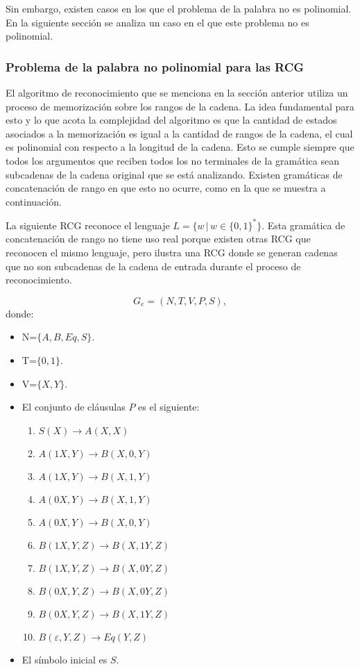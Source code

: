 \documentclass{article}
\begin{document}
Sin embargo, existen casos en los que el problema de la palabra no es polinomial. En la siguiente sección se analiza un caso en el que este problema no es polinomial.

\subsubsection{Problema de la palabra no polinomial para las RCG}

El algoritmo de reconocimiento que se menciona en la sección anterior utiliza un proceso de memorización sobre los rangos de la cadena.  La idea fundamental para esto y lo que acota la complejidad del algoritmo es que la cantidad de estados asociados a la memorización es igual a la cantidad de rangos de la cadena, el cual es polinomial con respecto a la longitud de la cadena. Esto se cumple siempre que todos los argumentos que reciben todos los no terminales de la gramática sean subcadenas de la cadena original que se está analizando. Existen gramáticas de concatenación de rango en que esto no ocurre, como en la que se muestra a continuación.

La siguiente RCG reconoce el lenguaje $L=\{w\,|\,w\in\{0,1\}^*\}$. Esta gramática de concatenación de rango no tiene uso real porque existen otras RCG que reconocen el mismo lenguaje, pero ilustra una RCG donde se generan cadenas que no son subcadenas de la cadena de entrada durante el proceso de reconocimiento.

\[
    G_e = (N, T, V, P, S),
\]
donde:

\begin{itemize}
    \item  N=$\{A,B,Eq,S\}$.
    \item T=$\{0,1\}$.
    \item V=$\{X,Y\}$.
    \item El conjunto de cláusulas $P$ es el siguiente:
          \begin{enumerate}
              \item $S(X)\to A(X,X)$
              \item $A(1X,Y)\to B(X,0,Y)$
              \item $A(1X,Y)\to B(X,1,Y)$
              \item $A(0X,Y)\to B(X,1,Y)$
              \item $A(0X,Y)\to B(X,0,Y)$
              \item $B(1X,Y,Z)\to B(X,1Y,Z)$
              \item $B(1X,Y,Z)\to B(X,0Y,Z)$
              \item $B(0X,Y,Z)\to B(X,0Y,Z)$
              \item $B(0X,Y,Z)\to B(X,1Y,Z)$
              \item $B(\varepsilon,Y,Z)\to Eq(Y,Z)$
          \end{enumerate}

    \item El símbolo inicial es $S$.
\end{itemize}
\end{document}
